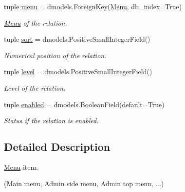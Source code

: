 \begin{DoxyCompactItemize}
tuple \hyperlink{classcore_1_1models_1_1MenuItem_afebbc45130eae0cea9c5095ef6cd98b1}{menu} = dmodels.\-Foreign\-Key(\hyperlink{classcore_1_1models_1_1Menu}{Menu}, db\-\_\-index=True)
\begin{DoxyCompactList}\small\item\em \hyperlink{classcore_1_1models_1_1Menu}{Menu} of the relation. \end{DoxyCompactList}\item 
tuple \hyperlink{classcore_1_1models_1_1MenuItem_a82ed62dbf13487126c5bc1f458c4b67c}{sort} = dmodels.\-Positive\-Small\-Integer\-Field()
\begin{DoxyCompactList}\small\item\em Numerical position of the relation. \end{DoxyCompactList}\item 
tuple \hyperlink{classcore_1_1models_1_1MenuItem_a57fc994079c4c38d7ef278c6d364f435}{level} = dmodels.\-Positive\-Small\-Integer\-Field()
\begin{DoxyCompactList}\small\item\em Level of the relation. \end{DoxyCompactList}\item 
tuple \hyperlink{classcore_1_1models_1_1MenuItem_ad8a9b116de08fe5fb590ac565c10917a}{enabled} = dmodels.\-Boolean\-Field(default=True)
\begin{DoxyCompactList}\small\item\em Status if the relation is enabled. \end{DoxyCompactList}\end{DoxyCompactItemize}


\subsection{Detailed Description}
\hyperlink{classcore_1_1models_1_1Menu}{Menu} item. 

(Main menu, Admin side menu, Admin top menu, ...) 

